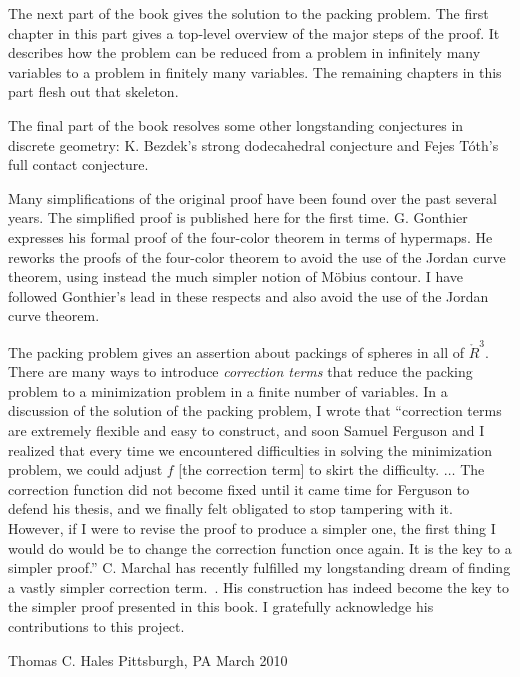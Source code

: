 The next part of the book gives the solution to the packing problem.
The first chapter in this part gives a top-level overview of the major
steps of the proof.  It describes how the problem can be reduced from
a problem in infinitely many variables to a problem in finitely many
variables.  The remaining chapters in this part flesh out that
skeleton.

The final part of the book resolves some other longstanding conjectures in
discrete geometry: K. Bezdek's strong dodecahedral conjecture and Fejes
T\'oth's full contact conjecture.

Many simplifications of the original proof have been found over the past
several years.  The simplified proof is published here for the first time.
G. Gonthier expresses his formal proof of the four-color
theorem in terms of hypermaps.  He reworks the proofs of the
four-color theorem to avoid the use of the Jordan curve theorem, using
instead the much simpler notion of M\"obius contour.  I have followed
Gonthier's lead in these respects and also avoid the use of the Jordan curve theorem.

The packing problem gives an assertion about packings of spheres in
all of $\ring{R}^3$.  There are many ways to introduce {\it correction
  terms} that reduce the packing problem to a minimization problem in
a finite number of variables.  In a discussion of the solution of the
packing problem, I wrote that ``correction terms are extremely
flexible and easy to construct, and soon Samuel Ferguson and I
realized that every time we encountered difficulties in solving the
minimization problem, we could adjust $f$ [the correction term] to
skirt the difficulty. $\ldots$ The correction function did not become
fixed until it came time for Ferguson to defend his thesis, and we
finally felt obligated to stop tampering with it.  However, if I were
to revise the proof to produce a simpler one, the first thing I would
do would be to change the correction function once again.  It is the
key to a simpler proof.''  C. Marchal has recently fulfilled my
longstanding dream of finding a vastly simpler correction term.~\cite{unknown}.  His
construction has indeed become the key to the simpler proof presented
in this book.  I gratefully acknowledge his contributions to this
project.





\bigskip
\hbox{}



\bigskip
\hbox{}

{
\parindent=0pt
\obeylines

Thomas C. Hales
Pittsburgh, PA
March 2010

}







